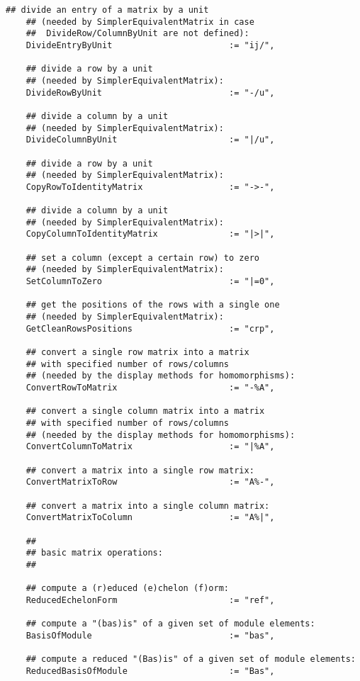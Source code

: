 \documentclass[a4paper,11pt]{report}
\begin{document}
{{{\begin{Verbatim}[fontsize=\small,frame=single,label=Code]
    ## divide an entry of a matrix by a unit
    ## (needed by SimplerEquivalentMatrix in case
    ##  DivideRow/ColumnByUnit are not defined):
    DivideEntryByUnit                       := "ij/",
    
    ## divide a row by a unit
    ## (needed by SimplerEquivalentMatrix):
    DivideRowByUnit                         := "-/u",
    
    ## divide a column by a unit
    ## (needed by SimplerEquivalentMatrix):
    DivideColumnByUnit                      := "|/u",
    
    ## divide a row by a unit
    ## (needed by SimplerEquivalentMatrix):
    CopyRowToIdentityMatrix                 := "->-",
    
    ## divide a column by a unit
    ## (needed by SimplerEquivalentMatrix):
    CopyColumnToIdentityMatrix              := "|>|",
    
    ## set a column (except a certain row) to zero
    ## (needed by SimplerEquivalentMatrix):
    SetColumnToZero                         := "|=0",
    
    ## get the positions of the rows with a single one
    ## (needed by SimplerEquivalentMatrix):
    GetCleanRowsPositions                   := "crp",
    
    ## convert a single row matrix into a matrix
    ## with specified number of rows/columns
    ## (needed by the display methods for homomorphisms):
    ConvertRowToMatrix                      := "-%A",
    
    ## convert a single column matrix into a matrix
    ## with specified number of rows/columns
    ## (needed by the display methods for homomorphisms):
    ConvertColumnToMatrix                   := "|%A",
    
    ## convert a matrix into a single row matrix:
    ConvertMatrixToRow                      := "A%-",
    
    ## convert a matrix into a single column matrix:
    ConvertMatrixToColumn                   := "A%|",
    
    ##
    ## basic matrix operations:
    ##
    
    ## compute a (r)educed (e)chelon (f)orm:
    ReducedEchelonForm                      := "ref",
    
    ## compute a "(bas)is" of a given set of module elements:
    BasisOfModule                           := "bas",
    
    ## compute a reduced "(Bas)is" of a given set of module elements:
    ReducedBasisOfModule                    := "Bas",
    

\end{Verbatim}}}}
\end{document}

